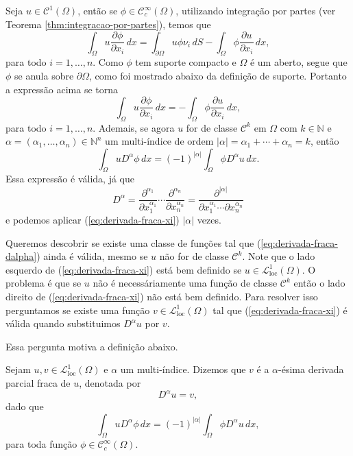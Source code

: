 \documentclass[a4paper, 11pt]{book}
\theoremstyle{definition}
\newcommand{\bN}{\mathbb{N}}
\newcommand{\cC}{\mathcal{C}}
\newcommand{\cL}{\mathcal{L}}
\begin{document}
Seja $u \in \cC^1(\Omega)$, então se $\phi \in \cC^\infty_c(\Omega)$, utilizando integração por partes (ver Teorema \ref{thm:integracao-por-partes}), temos que
\[
    \int_\Omega u \dfrac{\partial \phi}{\partial x_i} \,dx = \int_{\partial\Omega} u\phi \nu_i \, dS- \int_\Omega \phi \dfrac{\partial u}{\partial x_i} \,dx,
\]
para todo $i = 1,\dots,n$. Como $\phi$ tem suporte compacto e $\Omega$ é um aberto, segue que $\phi$ se anula sobre $\partial\Omega$, como foi mostrado abaixo da definição de suporte. Portanto a expressão acima se torna
\begin{equation} \label{eq:derivada-fraca-xi}
    \int_\Omega u \dfrac{\partial \phi}{\partial x_i} \,dx = - \int_\Omega \phi \dfrac{\partial u}{\partial x_i} \,dx,
\end{equation}
para todo $i = 1,\dots,n$.
Ademais, se agora $u$ for de classe $\cC^k$ em $\Omega$ com $k \in \bN$ e $\alpha = (\alpha_1,\dots,\alpha_n) \in \bN^n$ um multi-índice de ordem $|\alpha| = \alpha_1 + \cdots + \alpha_n = k$, então
\begin{equation} \label{eq:derivada-fraca-dalpha}
    \int_\Omega u D^\alpha \phi \,dx = (-1)^{|\alpha|} \int_\Omega \phi D^\alpha u \,dx.
\end{equation}
Essa expressão é válida, já que
\[
    D^\alpha = \dfrac{\partial^{\alpha_1} }{\partial x_1^{\alpha_1}} \cdots \dfrac{\partial^{\alpha_n} }{\partial x_n^{\alpha_n}} = \dfrac{\partial^{|\alpha|} }{\partial x_1^{\alpha_1} \cdots \partial x_n^{\alpha_n}}
\]
e podemos aplicar (\ref{eq:derivada-fraca-xi}) $|\alpha|$ vezes.

Queremos descobrir se existe uma classe de funções tal que (\ref{eq:derivada-fraca-dalpha}) ainda é válida, mesmo se $u$ não for de classe $\cC ^k$. Note que o lado esquerdo de (\ref{eq:derivada-fraca-xi}) está bem definido se $u \in \cL^1_{\mathrm{loc}}(\Omega)$.
O problema é que se $u$ não é necessáriamente uma função de classe $\cC^k$ então o lado direito de (\ref{eq:derivada-fraca-xi}) não está bem definido. Para resolver isso perguntamos se existe uma função $v \in \cL^1_{\mathrm{loc}}(\Omega)$ tal que (\ref{eq:derivada-fraca-xi}) é válida quando substituimos $D^\alpha u$ por $v$.

Essa pergunta motiva a definição abaixo.

\begin{dbox}
    Sejam $u,v \in \cL^1_{\mathrm{loc}}(\Omega)$ e $\alpha$ um multi-índice. Dizemos que $v$ é a $\alpha$-ésima derivada parcial fraca de $u$, denotada por
    \[
        D^\alpha u = v,
    \]
    dado que
    \begin{equation} \label{eq:derivada-fraca}
        \int_\Omega u D^\alpha \phi \,dx = (-1)^{|\alpha|} \int_\Omega \phi D^\alpha u\,dx,
    \end{equation}
    para toda função $\phi \in \cC ^\infty_c(\Omega)$.
\end{dbox}
\end{document}
